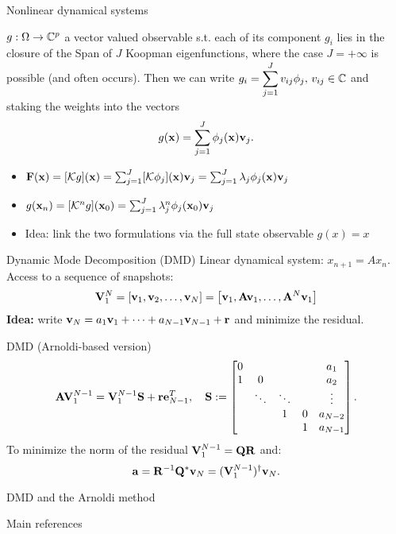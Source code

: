 \documentclass{beamer}
\begin{document}
\begin{frame}[fragile]{Nonlinear dynamical systems}
\begin{definition}
$g:\Omega\to\mathbb{C}^p$ a vector valued observable s.t. each of its component $g_i$ lies in the closure of the Span of $J$ Koopman eigenfunctions, where the case $J=+\infty$ is possible (and often occurs). Then we can write $\displaystyle{g_i = \sum_{j = 1}^J v_{ij}\phi_j, \, v_{ij}\in\mathbb{C}}$ and staking the weights into the vectors 
\begin{equation}
    \label{koopman_modes}
	g(\vb{x}) = \sum_{j = 1}^J \phi_j(\vb{x})\vb{v}_{j}.
\end{equation}
\end{definition}
\begin{itemize}
    \item $\vb{F}(\vb{x}) = [\mathcal{K}g](\vb{x}) = \sum_{j = 1}^J [\mathcal{K}\phi_j](\vb{x})\vb{v}_j = \sum_{j = 1}^J \lambda_j\phi_j(\vb{x})\vb{v}_j$
    \item $g(\vb{x}_n) = [\mathcal{K}^ng](\vb{x}_0) = \sum_{j = 1}^J \lambda_j^n\phi_j(\vb{x}_0)\vb{v}_{j}$ 
    \item Idea: link the two formulations via the full state observable $g(x) = x$
\end{itemize}
\end{frame}

\begin{frame}[fragile]{Dynamic Mode Decomposition (DMD)}
Linear dynamical system: $x_{n+1} = Ax_n$. Access to a sequence of snapshots:
\begin{equation*}
    \vb{V}_1^N = \left[\vb{v}_1, \vb{v}_2, \dots, \vb{v}_N\right] = \left[\vb{v}_1, \vb{A}\vb{v}_1, \dots, \vb{A}^N\vb{v}_1\right]
\end{equation*}
\alert{\textbf{Idea:}} write $\vb{v}_N = a_1 \vb{v}_1 + \dots + a_{N-1} \vb{v}_{N-1} + \vb{r}$ and minimize the residual.
\begin{block}{DMD (Arnoldi-based version)}
\begin{equation*}
    \vb{A}\vb{V}_1^{N-1}  = \vb{V}_1^{N-1}\vb{S} + \vb{r}\vb{e}_{N-1}^T, \quad 
    \vb{S} :=
   \begin{bmatrix}
   0     &        &       &      & a_1 \\
   1     & 0      &       &      & a_2 \\
         & \ddots & \ddots&      & \vdots \\ 
         &        & 1     & 0    & a_{N-2} \\
         &        &       & 1    & a_{N-1} \\
   \end{bmatrix}.
\end{equation*}
To minimize the norm of the residual $\vb{V}_1^{N-1} = \vb{Q}\vb{R}$ and:
\begin{equation*}
    \vb{a} = \vb{R}^{-1} \vb{Q}^*\vb{v}_N = (\vb{V}_1^{N-1})^{\dagger}\vb{v}_N.
\end{equation*}
\end{block}
\end{frame}

\begin{frame}{DMD and the Arnoldi method}
    
\end{frame}

\begin{frame}{Main references}
\nocite{*}
\printbibliography
\end{frame}
\end{document}
